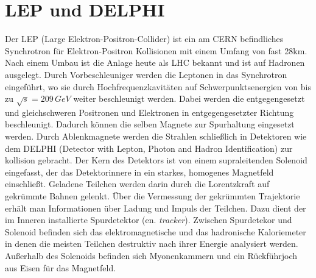 \documentclass{include/thesisclass3}
\newcommand{\e}[1]{\,\si{#1}}
\begin{document}
\section{LEP und DELPHI}
Der LEP (Large Elektron-Positron-Collider) ist ein am CERN befindliches Synchrotron für Elektron-Positron Kollisionen mit einem Umfang von fast 28km. Nach einem Umbau ist die Anlage heute als LHC bekannt und ist auf Hadronen ausgelegt. Durch Vorbeschleuniger werden die Leptonen in das Synchrotron eingeführt, wo sie durch Hochfrequenzkavitäten auf Schwerpunktsenergien von bis zu $\sqrt{s}=209\e{GeV}$ weiter beschleunigt werden. Dabei werden die entgegengesetzt und gleichschweren Positronen und Elektronen in entgegengesetzter Richtung beschleunigt. Dadurch können die selben Magnete zur Spurhaltung eingesetzt werden. Durch Ablenkmagnete werden die Strahlen schließlich in Detektoren wie dem DELPHI (Detector with Lepton, Photon and Hadron Identification) zur kollision gebracht. 
Der Kern des Detektors ist von einem supraleitenden Solenoid eingefasst, der das Detektorinnere in ein starkes, homogenes Magnetfeld einschließt. 
Geladene Teilchen werden darin durch die Lorentzkraft auf gekrümmte Bahnen gelenkt. 
Über die Vermessung der gekrümmten Trajektorie erhält man Informationen über Ladung und Impuls der Teilchen. 
Dazu dient der im Inneren installierte Spurdetektor (en. \textit{tracker}). 
Zwischen Spurdetekor und Solenoid befinden sich das elektromagnetische und das hadronische Kaloriemeter in denen die meisten Teilchen destruktiv nach ihrer Energie analysiert werden. 
Außerhalb des Solenoids befinden sich Myonenkammern und ein Rückführjoch aus Eisen für das Magnetfeld. 
\end{document}
